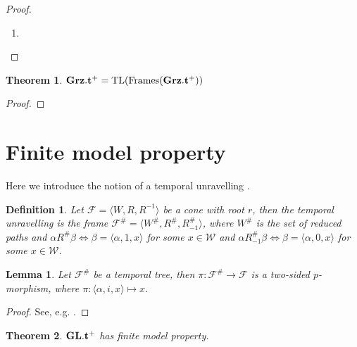 \documentclass[a4paper]{article}
\theoremstyle{defin}
\newtheorem{defin}{Definition}
\theoremstyle{theorem}
\newtheorem{theorem}{Theorem}
\theoremstyle{prop}
\theoremstyle{lemma}
\newtheorem{lemma}{Lemma}
\theoremstyle{ex}
\theoremstyle{col}
\begin{document}
\begin{proof}
  $ $

\begin{enumerate}
  \item
  \end{enumerate}
\end{proof}

\begin{theorem}
  ${\bf Grz}.{\bf t}^{+} = \operatorname{TL}(\operatorname{Frames}({\bf Grz}.{\bf t}^{+}))$
\end{theorem}

\begin{proof}
\end{proof}

\section{Finite model property}

Here we introduce the notion of a temporal unravelling \cite{Shehtman14}.

\begin{defin}
  Let $\mathcal{F} = \langle W, R, R^{-1} \rangle$ be a cone with root $r$, then the temporal unravelling is the frame
  $\mathcal{F}^{\#} = \langle W^{\#}, R^{\#}, R_{-1}^{\#} \rangle$, where $W^{\#}$ is the set of reduced paths and
  $\alpha R^{\#} \beta \Leftrightarrow \beta = \langle \alpha, 1, x \rangle$ for some $x \in \mathcal{W}$ and
  $\alpha R_{-1}^{\#} \beta \Leftrightarrow \beta = \langle \alpha, 0, x \rangle$ for some $x \in \mathcal{W}$.
\end{defin}

\begin{lemma} Let $\mathcal{F}^{\#}$ be a temporal tree, then $\pi : \mathcal{F}^{\#} \to \mathcal{F}$ is a two-sided $p$-morphism, where
  $\pi : \langle \alpha, i, x \rangle \mapsto x$.
\end{lemma}
\begin{proof}
  See, e.g. \cite{Shehtman14}.
\end{proof}

\begin{theorem}
  ${\bf GL}.{\bf t}^{+}$ has finite model property.
\end{theorem}
\end{document}
